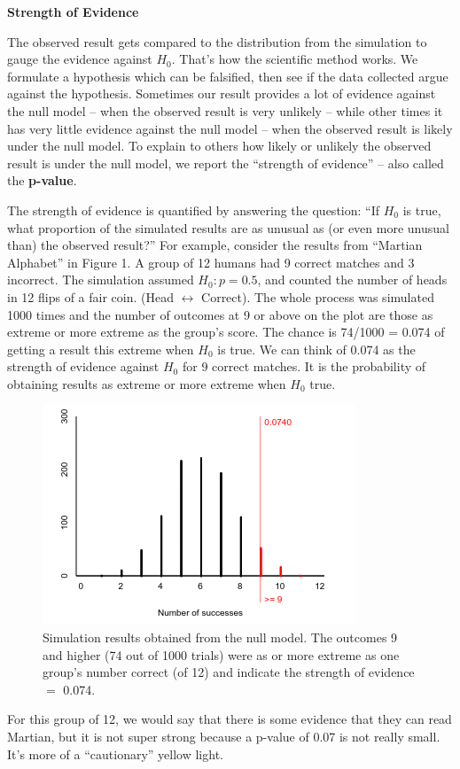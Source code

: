 \begin{center}
        {\large\bf Strength of Evidence}
 \end{center}
      The observed result gets compared to the distribution from the
      simulation to gauge the evidence against $H_0$.  That's
      how the scientific method works.  We formulate a hypothesis
      which can be falsified, then see if the data collected argue
      against the hypothesis. Sometimes our result provides a lot of
      evidence against the null model  -- when the observed result is very
      unlikely -- while other times it has very little evidence against
      the null model -- when the observed result is likely under the null
      model. To explain to others  how likely or unlikely the
      observed result is under the null model, we  report the
      ``strength of evidence'' -- also called the {\bf p-value}. 

      The strength of evidence is quantified by answering the
      question: ``If $H_0$ is true, what proportion of the simulated
      results are as unusual as (or even more unusual than) the
      observed result?'' 
      For example, consider the results from ``Martian Alphabet''  in
      Figure 1. A group of 12 humans had 9 correct matches and 3
      incorrect. The simulation assumed $H_0: p = 0.5$, and counted
      the number of heads in 12 flips of a fair coin. (Head
      $\leftrightarrow$ Correct). 
      The whole process was simulated 1000 times and the number of
      outcomes at 9 or above on the plot are those as extreme or more
      extreme as the group's score. The chance is 74/1000 =
      0.074 of getting a result this extreme when $H_0$ is
      true.  We can think of 0.074 as the strength of evidence against
      $H_0$  for 9 correct matches. It is
      the probability of obtaining results as extreme or more extreme
      when $H_0$ true.
 \begin{figure}[h]
   \centering
  \includegraphics[width=.5\linewidth]{../plots/StrOfEvidence-12Guesses.png}

   \caption{ Simulation results obtained from the null model. The
      outcomes 9 and higher (74 out of 1000 trials) were as or more extreme
      as one group's number correct (of 12) and indicate the strength of
      evidence $=$ 0.074. }
   \label{fig:SOE-12}
 \end{figure}
  For this group of 12, we would say that there is some evidence that
  they can read Martian, but it is not super strong because a p-value
  of 0.07 is not really small. It's more of a ``cautionary'' yellow
  light. 

